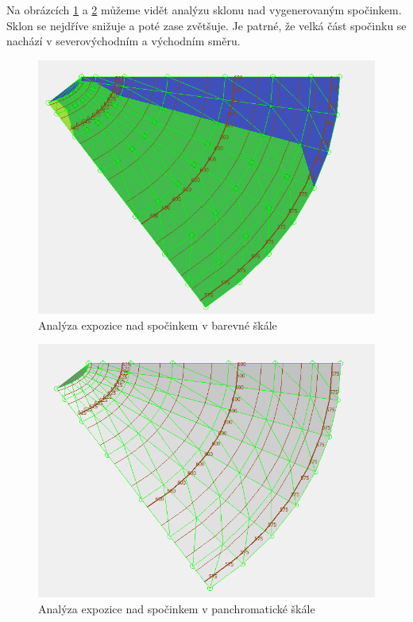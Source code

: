 \documentclass[a4paper,11pt,twoside]{article}
\begin{document}
Na obrázcích \ref{fig:gentle_ridge_colorful_aspect} a \ref{fig:gentle_ridge_panchromatic_aspect} můžeme vidět analýzu sklonu nad vygenerovaným spočinkem. Sklon se nejdříve snižuje a poté zase zvětšuje. Je patrné, že velká část spočinku se nachází v severovýchodním a východním směru.

\begin{figure}[hbt!] 
\begin{center}
\includegraphics[width=12cm]{pictures/gentle_ridge_colorful_aspect.PNG} 
\caption[Analýza expozice nad spočinkem v barevné škále]{Analýza expozice nad spočinkem v barevné škále}
\label{fig:gentle_ridge_colorful_aspect}
\end{center}
\end{figure}

\vspace{0.2cm}
\begin{figure}[hbt!] 
\begin{center}
\includegraphics[width=15cm]{pictures/gentle_ridge_panchromatic_aspect.PNG} 
\caption[Analýza expozice nad spočinkem v panchromatické škále]{Analýza expozice nad spočinkem v panchromatické škále}
\label{fig:gentle_ridge_panchromatic_aspect}
\end{center}
\end{figure}
\end{document}

